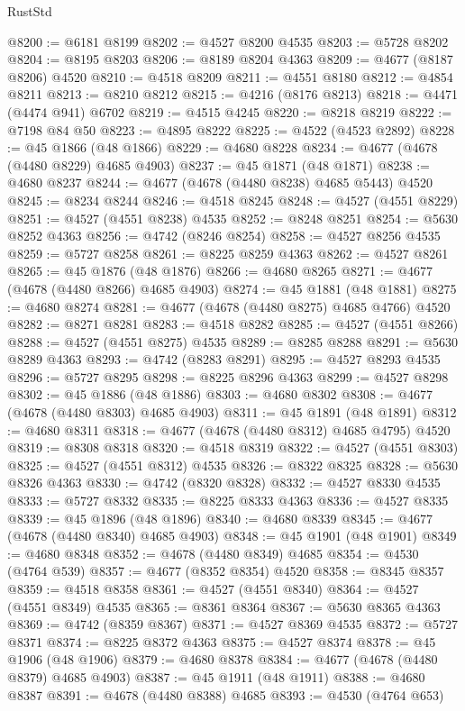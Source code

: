 \begin{lexlean}{RustStd}
\begin{coremodule}
@8200 := @6181 @8199
@8202 := @4527 @8200 @4535
@8203 := @5728 @8202
@8204 := @8195 @8203
@8206 := @8189 @8204 @4363
@8209 := @4677 (@8187 @8206) @4520
@8210 := @4518 @8209
@8211 := @4551 @8180
@8212 := @4854 @8211
@8213 := @8210 @8212
@8215 := @4216 (@8176 @8213)
@8218 := @4471 (@4474 @941) @6702
@8219 := @4515 @4245
@8220 := @8218 @8219
@8222 := @7198 @84 @50
@8223 := @4895 @8222
@8225 := @4522 (@4523 @2892)
@8228 := @45 @1866 (@48 @1866)
@8229 := @4680 @8228
@8234 := @4677 (@4678 (@4480 @8229) @4685 @4903)
@8237 := @45 @1871 (@48 @1871)
@8238 := @4680 @8237
@8244 := @4677 (@4678 (@4480 @8238) @4685 @5443) @4520
@8245 := @8234 @8244
@8246 := @4518 @8245
@8248 := @4527 (@4551 @8229)
@8251 := @4527 (@4551 @8238) @4535
@8252 := @8248 @8251
@8254 := @5630 @8252 @4363
@8256 := @4742 (@8246 @8254)
@8258 := @4527 @8256 @4535
@8259 := @5727 @8258
@8261 := @8225 @8259 @4363
@8262 := @4527 @8261
@8265 := @45 @1876 (@48 @1876)
@8266 := @4680 @8265
@8271 := @4677 (@4678 (@4480 @8266) @4685 @4903)
@8274 := @45 @1881 (@48 @1881)
@8275 := @4680 @8274
@8281 := @4677 (@4678 (@4480 @8275) @4685 @4766) @4520
@8282 := @8271 @8281
@8283 := @4518 @8282
@8285 := @4527 (@4551 @8266)
@8288 := @4527 (@4551 @8275) @4535
@8289 := @8285 @8288
@8291 := @5630 @8289 @4363
@8293 := @4742 (@8283 @8291)
@8295 := @4527 @8293 @4535
@8296 := @5727 @8295
@8298 := @8225 @8296 @4363
@8299 := @4527 @8298
@8302 := @45 @1886 (@48 @1886)
@8303 := @4680 @8302
@8308 := @4677 (@4678 (@4480 @8303) @4685 @4903)
@8311 := @45 @1891 (@48 @1891)
@8312 := @4680 @8311
@8318 := @4677 (@4678 (@4480 @8312) @4685 @4795) @4520
@8319 := @8308 @8318
@8320 := @4518 @8319
@8322 := @4527 (@4551 @8303)
@8325 := @4527 (@4551 @8312) @4535
@8326 := @8322 @8325
@8328 := @5630 @8326 @4363
@8330 := @4742 (@8320 @8328)
@8332 := @4527 @8330 @4535
@8333 := @5727 @8332
@8335 := @8225 @8333 @4363
@8336 := @4527 @8335
@8339 := @45 @1896 (@48 @1896)
@8340 := @4680 @8339
@8345 := @4677 (@4678 (@4480 @8340) @4685 @4903)
@8348 := @45 @1901 (@48 @1901)
@8349 := @4680 @8348
@8352 := @4678 (@4480 @8349) @4685
@8354 := @4530 (@4764 @539)
@8357 := @4677 (@8352 @8354) @4520
@8358 := @8345 @8357
@8359 := @4518 @8358
@8361 := @4527 (@4551 @8340)
@8364 := @4527 (@4551 @8349) @4535
@8365 := @8361 @8364
@8367 := @5630 @8365 @4363
@8369 := @4742 (@8359 @8367)
@8371 := @4527 @8369 @4535
@8372 := @5727 @8371
@8374 := @8225 @8372 @4363
@8375 := @4527 @8374
@8378 := @45 @1906 (@48 @1906)
@8379 := @4680 @8378
@8384 := @4677 (@4678 (@4480 @8379) @4685 @4903)
@8387 := @45 @1911 (@48 @1911)
@8388 := @4680 @8387
@8391 := @4678 (@4480 @8388) @4685
@8393 := @4530 (@4764 @653)

\end{coremodule}
\end{lexlean}
